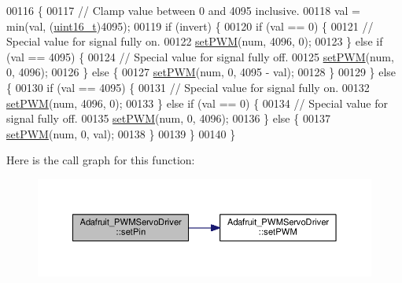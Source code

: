 \begin{DoxyCode}
00116                                                                            \{
00117     \textcolor{comment}{// Clamp value between 0 and 4095 inclusive.}
00118     val = min(val, (\hyperlink{Adafruit__PWMServoDriver_8h_a395b3b2bf5cb4674ab41b6bda68c15bb}{uint16\_t})4095);
00119     \textcolor{keywordflow}{if} (invert) \{
00120         \textcolor{keywordflow}{if} (val == 0) \{
00121             \textcolor{comment}{// Special value for signal fully on.}
00122             \hyperlink{classAdafruit__PWMServoDriver_a724a7fc39c6fba34478ecc0eea038bd3}{setPWM}(num, 4096, 0);
00123         \} \textcolor{keywordflow}{else} \textcolor{keywordflow}{if} (val == 4095) \{
00124             \textcolor{comment}{// Special value for signal fully off.}
00125             \hyperlink{classAdafruit__PWMServoDriver_a724a7fc39c6fba34478ecc0eea038bd3}{setPWM}(num, 0, 4096);
00126         \} \textcolor{keywordflow}{else} \{
00127             \hyperlink{classAdafruit__PWMServoDriver_a724a7fc39c6fba34478ecc0eea038bd3}{setPWM}(num, 0, 4095 - val);
00128         \}
00129     \} \textcolor{keywordflow}{else} \{
00130         \textcolor{keywordflow}{if} (val == 4095) \{
00131             \textcolor{comment}{// Special value for signal fully on.}
00132             \hyperlink{classAdafruit__PWMServoDriver_a724a7fc39c6fba34478ecc0eea038bd3}{setPWM}(num, 4096, 0);
00133         \} \textcolor{keywordflow}{else} \textcolor{keywordflow}{if} (val == 0) \{
00134             \textcolor{comment}{// Special value for signal fully off.}
00135             \hyperlink{classAdafruit__PWMServoDriver_a724a7fc39c6fba34478ecc0eea038bd3}{setPWM}(num, 0, 4096);
00136         \} \textcolor{keywordflow}{else} \{
00137             \hyperlink{classAdafruit__PWMServoDriver_a724a7fc39c6fba34478ecc0eea038bd3}{setPWM}(num, 0, val);
00138         \}
00139     \}
00140 \}
\end{DoxyCode}


Here is the call graph for this function\+:
\nopagebreak
\begin{figure}[H]
\begin{center}
\leavevmode
\includegraphics[width=350pt]{classAdafruit__PWMServoDriver_a1246cd50849fe0f068cc5d474e06ae96_cgraph}
\end{center}
\end{figure}


